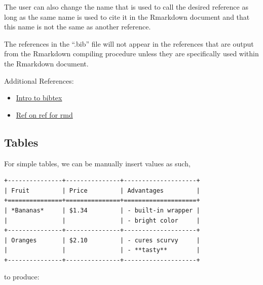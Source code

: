 \documentclass[]{book}
\providecommand{\tightlist}{%
  \setlength{\itemsep}{0pt}\setlength{\parskip}{0pt}}
\theoremstyle{definition}
\theoremstyle{definition}
\theoremstyle{remark}
\let\BeginKnitrBlock\begin \let\EndKnitrBlock\end
\begin{document}
\BeginKnitrBlock{rmdnote}
The user can also change the name that is used to call the desired
reference as long as the same name is used to cite it in the Rmarkdown
document and that this name is not the same as another reference.
\EndKnitrBlock{rmdnote}

\BeginKnitrBlock{rmdcaution}
The references in the ``.bib'' file will not appear in the references
that are output from the Rmarkdown compiling procedure unless they are
specifically used within the Rmarkdown document.
\EndKnitrBlock{rmdcaution}

Additional References:

\begin{itemize}
\tightlist
\item
  \href{https://www.economics.utoronto.ca/osborne/latex/BIBTEX.HTM}{Intro
  to bibtex}
\item
  \href{http://rmarkdown.rstudio.com/authoring_bibliographies_and_citations.html}{Ref
  on ref for rmd}
\end{itemize}

\subsection{Tables}\label{tables}

For simple tables, we can be manually insert values as such,

\begin{verbatim}
+---------------+---------------+--------------------+
| Fruit         | Price         | Advantages         |
+===============+===============+====================+
| *Bananas*     | $1.34         | - built-in wrapper |
|               |               | - bright color     |
+---------------+---------------+--------------------+
| Oranges       | $2.10         | - cures scurvy     |
|               |               | - **tasty**        |
+---------------+---------------+--------------------+
\end{verbatim}

to produce:
\end{document}
